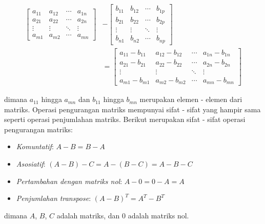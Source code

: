\begin{align} \label{eq:matrix_substraction}
	\begin{bmatrix}
		a_{11} & a_{12} & \cdots & a_{1n} \\
		a_{21} & a_{22} & \cdots & a_{2n} \\
		\vdots & \vdots & \ddots & \vdots \\
		a_{m1} & a_{m2} & \cdots & a_{mn}
	\end{bmatrix}
	 & -
	\begin{bmatrix}
		b_{11} & b_{12} & \cdots & b_{1p} \\
		b_{21} & b_{22} & \cdots & b_{2p} \\
		\vdots & \vdots & \ddots & \vdots \\
		b_{n1} & b_{n2} & \cdots & b_{np}
	\end{bmatrix}
	\nonumber \\
	 & =
	\begin{bmatrix}
		a_{11} - b_{11} & a_{12} - b_{12} & \cdots & a_{1n} - b_{1n} \\
		a_{21} - b_{21} & a_{22} - b_{22} & \cdots & a_{2n} - b_{2n} \\
		\vdots          & \vdots          & \ddots & \vdots          \\
		a_{m1} - b_{m1} & a_{m2} - b_{m2} & \cdots & a_{mn} - b_{mn}
	\end{bmatrix}
\end{align}

\noindent
dimana $a_{11}$ hingga $a_{mn}$ dan $b_{11}$ hingga $b_{mn}$ merupakan elemen - elemen dari matriks. Operasi
pengurangan matriks mempunyai sifat - sifat yang hampir sama seperti operasi
penjumlahan matriks. Berikut merupakan sifat - sifat operasi pengurangan matriks:

\begin{itemize}
	\label{property_substraction_matrix}

	\item \emph{Komuntatif}: $A - B = B - A$

	\item \emph{Asosiatif}: $(A - B) - C = A - (B - C) = A - B - C$

	\item \emph{Pertambahan dengan matriks nol}: $A - 0 = 0 - A = A$

	\item \emph{Penjumlahan transpose}: $(A - B)^{T}= A^{T}- B^{T}$
\end{itemize}

\noindent
dimana $A$, $B$, $C$ adalah matriks, dan $0$ adalah matriks nol.

